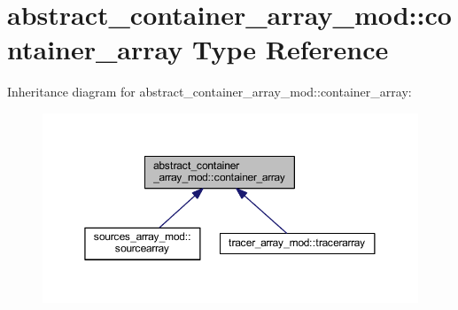 \hypertarget{structabstract__container__array__mod_1_1container__array}{}\section{abstract\+\_\+container\+\_\+array\+\_\+mod\+:\+:container\+\_\+array Type Reference}
\label{structabstract__container__array__mod_1_1container__array}


Inheritance diagram for abstract\+\_\+container\+\_\+array\+\_\+mod\+:\+:container\+\_\+array\+:
\nopagebreak
\begin{figure}[H]
\begin{center}
\leavevmode
\includegraphics[width=350pt]{structabstract__container__array__mod_1_1container__array__inherit__graph}
\end{center}
\end{figure}
